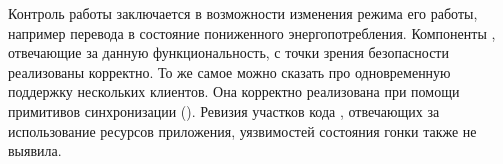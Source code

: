 %
Контроль работы  заключается в возможности изменения режима его работы, например перевода в состояние пониженного энергопотребления. 
%
Компоненты , отвечающие за данную функциональность, с точки зрения безопасности реализованы корректно. 
%
То же самое можно сказать про одновременную поддержку нескольких клиентов. 
%
Она корректно реализована при помощи примитивов синхронизации (). 
%
Ревизия участков кода , отвечающих за использование ресурсов приложения, уязвимостей состояния гонки также не выявила. 